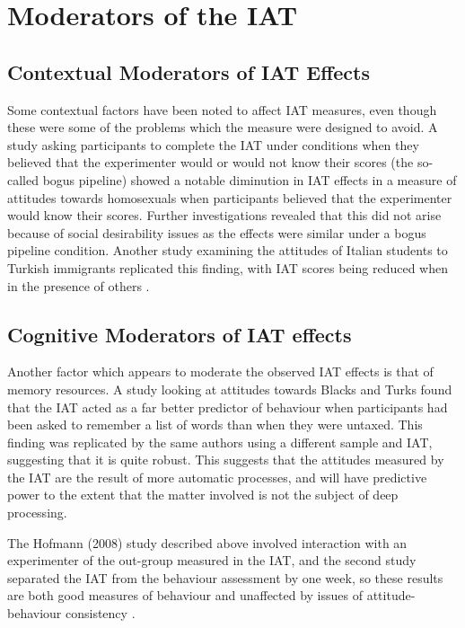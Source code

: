 \section{Moderators of the IAT}
\label{sec:moderators-iat}

\subsection{Contextual Moderators of IAT Effects}
\label{sec:cont-moder-iat}



Some contextual factors have been noted to affect IAT measures, even though these were some of the problems which the measure were designed to avoid. A study asking participants to complete the IAT under conditions when they believed that the experimenter would or would not know their scores (the so-called bogus pipeline) \cite{Boysen2006} showed a notable diminution in IAT effects in a measure of attitudes towards homosexuals when participants believed that the experimenter would know their scores. Further investigations revealed that this did not arise because of social desirability issues as the effects were similar under a bogus pipeline condition. Another study examining the attitudes of Italian students to Turkish immigrants replicated this finding, with IAT scores being reduced when in the presence of others \cite{Castelli2008}. 

\subsection{Cognitive Moderators of IAT effects}
\label{sec:cogn-moder-iat}



Another factor which appears to moderate the observed IAT effects is that of memory resources. A study looking at attitudes towards Blacks and Turks \cite{Hofmann2008a} found that the IAT acted as a far better predictor of behaviour when participants had been asked to remember a list of words than when they were untaxed. This finding was replicated by the same authors using a different sample and IAT, suggesting that it is quite robust.  This suggests that the attitudes measured by the IAT are the result of more automatic processes, and will have predictive power to the extent that the matter involved is not the subject of deep processing. 

The Hofmann (2008) study described above involved interaction with an experimenter of the out-group measured in the IAT, and the second study separated the IAT from the behaviour assessment by one week, so these results are both good measures of behaviour and unaffected by  issues of attitude-behaviour consistency . 

